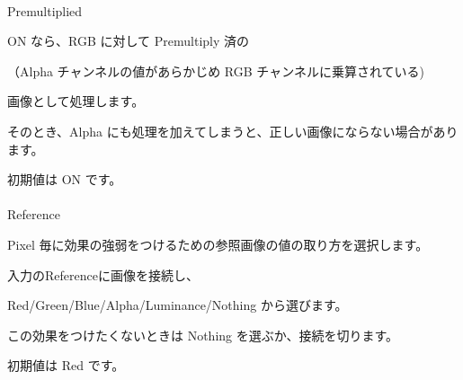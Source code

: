 \documentclass[a4paper,12pt]{article}
\begin{document}
\newpage

\thispagestyle{empty}

\ \vspace{-0.2em}
\par
\noindent Premultiplied\par
ON なら、RGB に対して Premultiply 済の\par
（Alpha チャンネルの値があらかじめ RGB チャンネルに乗算されている)\par
画像として処理します。\par
そのとき、Alpha にも処理を加えてしまうと、正しい画像にならない場合があります。\par
初期値は ON です。\\
\\
Reference\par
Pixel 毎に効果の強弱をつけるための参照画像の値の取り方を選択します。\par
入力の\textquotedbl Reference\textquotedbl に画像を接続し、\par
Red/Green/Blue/Alpha/Luminance/Nothing から選びます。\par
この効果をつけたくないときは Nothing を選ぶか、接続を切ります。\par
初期値は Red です。
\end{document}
